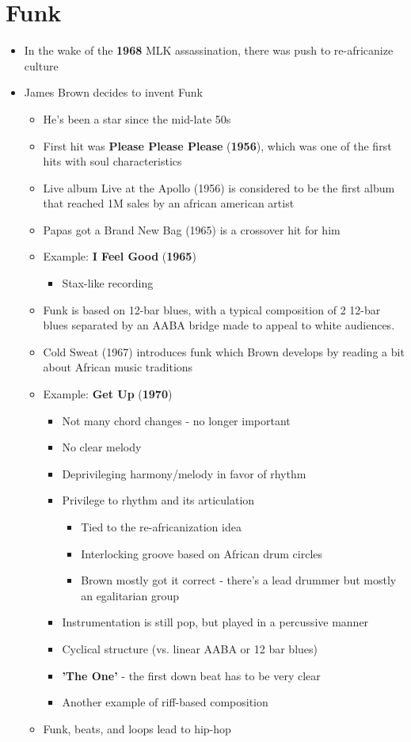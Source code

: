 \documentclass[11pt]{report}
\newcommand{\imp}[1]{\textbf{#1}}
\newcommand{\idate}[2]{\textcolor{blue!50}{\imp{#1}}\label{date:#2}}
\newcommand{\bl}{\begin{itemize}}
\newcommand{\kl}{\end{itemize}}
\newcommand{\song}[2]{\textcolor{red!70}{\textbf{#1}} (\idate{#2}{#1})}
\begin{document}
\section{Funk}
\begin{itemize}
	\item In the wake of the \idate{1968}{mlk-assassination} MLK assassination, there was push to re-africanize culture
	\item James Brown decides to invent Funk
	\bl
		\item He's been a star since the mid-late 50s
		\item First hit was \song{Please Please Please}{1956}, which was one of the first hits with soul characteristics
		\item Live album Live at the Apollo (1956) is considered to be the first album that reached 1M sales by an african american artist
		\item Papas got a Brand New Bag (1965) is a crossover hit for him
		\item Example: \song{I Feel Good}{1965}
		\bl
			\item Stax-like recording
		\kl
		\item Funk is based on 12-bar blues, with a typical composition of 2 12-bar blues separated by an AABA bridge made to appeal to white audiences.
		\item Cold Sweat (1967) introduces funk which Brown develops by reading a bit about African music traditions
		\item Example: \song{Get Up}{1970}
		\bl
			\item Not many chord changes - no longer important
			\item No clear melody
			\item Deprivileging harmony/melody in favor of rhythm
			\item Privilege to rhythm and its articulation
			\bl
				\item Tied to the re-africanization idea
				\item Interlocking groove based on African drum circles
				\item Brown mostly got it correct - there's a lead drummer but mostly an egalitarian group
			\kl
			\item Instrumentation is still pop, but played in a percussive manner
			\item Cyclical structure (vs. linear AABA or 12 bar blues)
			\item \textbf{'The One'} - the first down beat has to be very clear
			\item Another example of riff-based composition
		\kl
		\item Funk, beats, and loops lead to hip-hop
	\kl
\end{itemize}
\end{document}
